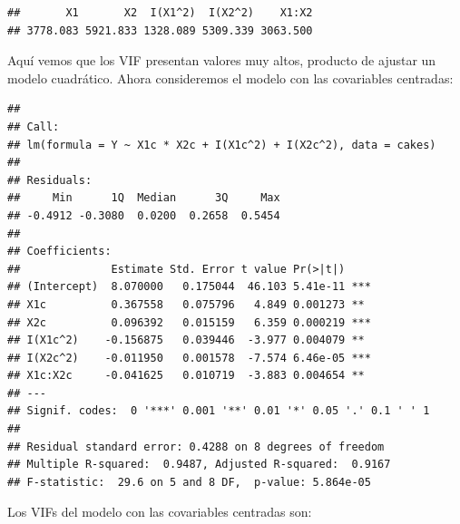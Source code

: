 \documentclass[
]{article}
\newenvironment{Shaded}{\begin{snugshade}}{\end{snugshade}}
\newcommand{\AttributeTok}[1]{\textcolor[rgb]{0.77,0.63,0.00}{#1}}
\newcommand{\DecValTok}[1]{\textcolor[rgb]{0.00,0.00,0.81}{#1}}
\newcommand{\FunctionTok}[1]{\textcolor[rgb]{0.00,0.00,0.00}{#1}}
\newcommand{\NormalTok}[1]{#1}
\newcommand{\OtherTok}[1]{\textcolor[rgb]{0.56,0.35,0.01}{#1}}
\newcommand{\SpecialCharTok}[1]{\textcolor[rgb]{0.00,0.00,0.00}{#1}}
\begin{document}
\begin{verbatim}
##       X1       X2  I(X1^2)  I(X2^2)    X1:X2 
## 3778.083 5921.833 1328.089 5309.339 3063.500
\end{verbatim}

Aquí vemos que los VIF presentan valores muy altos, producto de ajustar un modelo cuadrático. Ahora consideremos el modelo con las covariables centradas:

\begin{Shaded}
\end{Shaded}

\begin{verbatim}
## 
## Call:
## lm(formula = Y ~ X1c * X2c + I(X1c^2) + I(X2c^2), data = cakes)
## 
## Residuals:
##     Min      1Q  Median      3Q     Max 
## -0.4912 -0.3080  0.0200  0.2658  0.5454 
## 
## Coefficients:
##              Estimate Std. Error t value Pr(>|t|)    
## (Intercept)  8.070000   0.175044  46.103 5.41e-11 ***
## X1c          0.367558   0.075796   4.849 0.001273 ** 
## X2c          0.096392   0.015159   6.359 0.000219 ***
## I(X1c^2)    -0.156875   0.039446  -3.977 0.004079 ** 
## I(X2c^2)    -0.011950   0.001578  -7.574 6.46e-05 ***
## X1c:X2c     -0.041625   0.010719  -3.883 0.004654 ** 
## ---
## Signif. codes:  0 '***' 0.001 '**' 0.01 '*' 0.05 '.' 0.1 ' ' 1
## 
## Residual standard error: 0.4288 on 8 degrees of freedom
## Multiple R-squared:  0.9487, Adjusted R-squared:  0.9167 
## F-statistic:  29.6 on 5 and 8 DF,  p-value: 5.864e-05
\end{verbatim}

Los VIFs del modelo con las covariables centradas son:
\end{document}
